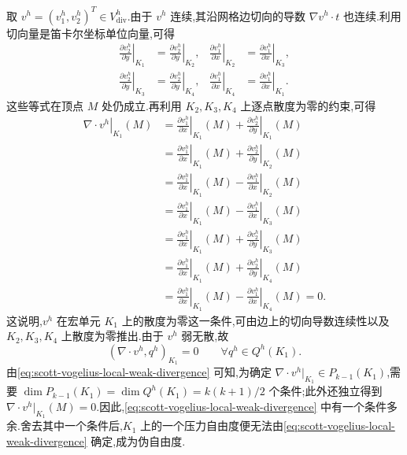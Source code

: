 \begin{example}
取 $v^h=(v_1^h,v_2^h)^T\in V_{\mathrm{div}}^h$.由于 $v^h$ 连续,其沿网格边切向的导数 $\nabla v^h\cdot t$ 也连续.利用切向量是笛卡尔坐标单位向量,可得
\[
\begin{aligned}
  \left.\frac{\partial v_2^h}{\partial y}\right|_{K_1}
   &=\left.\frac{\partial v_2^h}{\partial y}\right|_{K_2},
  &\left.\frac{\partial v_1^h}{\partial x}\right|_{K_2}
   &=\left.\frac{\partial v_1^h}{\partial x}\right|_{K_3},\\
  \left.\frac{\partial v_2^h}{\partial y}\right|_{K_3}
   &=\left.\frac{\partial v_2^h}{\partial y}\right|_{K_4},
  &\left.\frac{\partial v_1^h}{\partial x}\right|_{K_4}
   &=\left.\frac{\partial v_1^h}{\partial x}\right|_{K_1}.
\end{aligned}
\]
这些等式在顶点 $M$ 处仍成立.再利用 $K_2,K_3,K_4$ 上逐点散度为零的约束,可得
\[
\begin{aligned}
  \left.\nabla\cdot v^h\right|_{K_1}(M)
   &=\left.\frac{\partial v_1^h}{\partial x}\right|_{K_1}(M)
     +\left.\frac{\partial v_2^h}{\partial y}\right|_{K_1}(M)\\
   &=\left.\frac{\partial v_1^h}{\partial x}\right|_{K_1}(M)
     +\left.\frac{\partial v_2^h}{\partial y}\right|_{K_2}(M)\\
   &=\left.\frac{\partial v_1^h}{\partial x}\right|_{K_1}(M)
     -\left.\frac{\partial v_1^h}{\partial x}\right|_{K_2}(M)\\
   &=\left.\frac{\partial v_1^h}{\partial x}\right|_{K_1}(M)
     -\left.\frac{\partial v_1^h}{\partial x}\right|_{K_3}(M)\\
   &=\left.\frac{\partial v_1^h}{\partial x}\right|_{K_1}(M)
     +\left.\frac{\partial v_2^h}{\partial y}\right|_{K_3}(M)\\
   &=\left.\frac{\partial v_1^h}{\partial x}\right|_{K_1}(M)
     +\left.\frac{\partial v_2^h}{\partial y}\right|_{K_4}(M)\\
   &=\left.\frac{\partial v_1^h}{\partial x}\right|_{K_1}(M)
     -\left.\frac{\partial v_1^h}{\partial x}\right|_{K_4}(M)=0.
\end{aligned}
\]
这说明,$v^h$ 在宏单元 $K_1$ 上的散度为零这一条件,可由边上的切向导数连续性以及 $K_2,K_3,K_4$ 上散度为零推出.由于 $v^h$ 弱无散,故
\begin{equation}\label{eq:scott-vogelius-local-weak-divergence}
  (\nabla\cdot v^h,q^h)_{K_1}=0
  \qquad\forall q^h\in Q^h(K_1).
\end{equation}
由\cref{eq:scott-vogelius-local-weak-divergence} 可知,为确定 $\nabla\cdot v^h|_{K_1}\in P_{k-1}(K_1)$,需要 $\dim P_{k-1}(K_1)=\dim Q^h(K_1)=k(k+1)/2$ 个条件;此外还独立得到 $\nabla\cdot v^h|_{K_1}(M)=0$.因此,\cref{eq:scott-vogelius-local-weak-divergence} 中有一个条件多余.舍去其中一个条件后,$K_1$ 上的一个压力自由度便无法由\cref{eq:scott-vogelius-local-weak-divergence} 确定,成为伪自由度.
\end{example}

